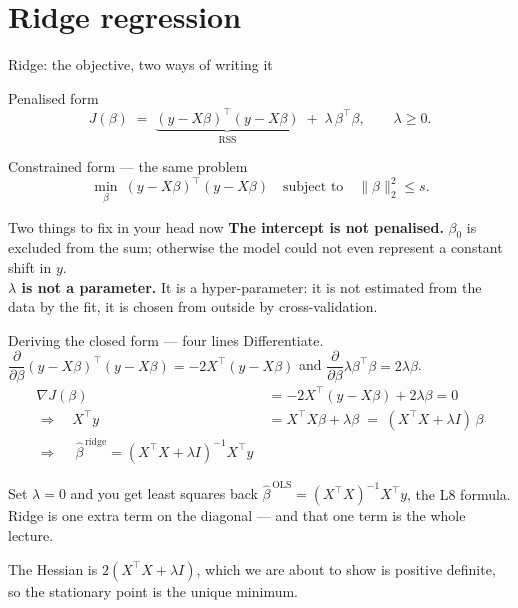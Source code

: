 \documentclass[aspectratio=169]{beamer}
\begin{document}
\section[Ridge]{Ridge regression}
\label{sec:ridge}

\begin{frame}[shrink=6]{Ridge: the objective, two ways of writing it}
  \begin{exampleblock}{Penalised form}
    \[
      J(\beta) \;=\; \underbrace{(y - X\beta)^{\!\top}(y - X\beta)}_{\text{RSS}}
      \;+\; \lambda\,\beta^{\!\top}\beta ,
      \qquad \lambda \ge 0 .
    \]
  \end{exampleblock}
  \begin{exampleblock}{Constrained form --- the same problem}
    \[
      \min_\beta\ (y - X\beta)^{\!\top}(y - X\beta)
      \quad\text{subject to}\quad \|\beta\|_2^2 \le s .
    \]
  \end{exampleblock}
  \vspace{0.2em}
  \begin{block}{Two things to fix in your head now}
    \small \textbf{The intercept is not penalised.} $\beta_0$ is excluded from
    the sum; otherwise the model could not even represent a constant shift
    in $y$.\\[0.25em]
    \textbf{$\lambda$ is not a parameter.} It is a hyper-parameter: it is not
    estimated from the data by the fit, it is chosen from outside by
    cross-validation.
  \end{block}
\end{frame}

\begin{frame}[shrink=4]{Deriving the closed form --- four lines}
  Differentiate. $\dfrac{\partial}{\partial\beta}(y-X\beta)^{\!\top}(y-X\beta)
  = -2X^{\!\top}(y - X\beta)$ and
  $\dfrac{\partial}{\partial\beta}\lambda\beta^{\!\top}\beta = 2\lambda\beta$.
  \begin{align*}
    \nabla J(\beta) &= -2X^{\!\top}(y - X\beta) + 2\lambda\beta = 0\\[2pt]
    \Longrightarrow\quad X^{\!\top}y &= X^{\!\top}\!X\beta + \lambda\beta
      \;=\; (X^{\!\top}\!X + \lambda I)\,\beta\\[2pt]
    \Longrightarrow\quad
    \boxed{\ \hat\beta^{\,\mathrm{ridge}}
      = (X^{\!\top}\!X + \lambda I)^{-1} X^{\!\top}y\ }
  \end{align*}
  \begin{block}{Set $\lambda = 0$ and you get least squares back}
    \small $\hat\beta^{\,\mathrm{OLS}} = (X^{\!\top}\!X)^{-1}X^{\!\top}y$, the
    L8 formula. Ridge is one extra term on the diagonal --- and that one term
    is the whole lecture.
  \end{block}
  \begin{center}\small
    The Hessian is $2(X^{\!\top}\!X + \lambda I)$, which we are about to show
    is positive definite, so the stationary point is the unique minimum.
  \end{center}
\end{frame}
\end{document}
